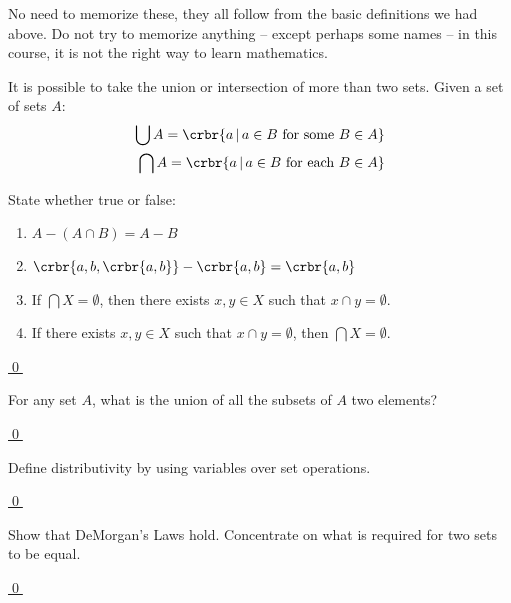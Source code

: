 \documentclass[11pt]{article}
\begin{document}
{%

\item No need to memorize these, they all follow from the basic definitions we
had above. Do not try to memorize anything -- except perhaps some names -- in
this course, it is not the right way to
learn mathematics.  

\item It is possible to take the union or intersection of more than two sets. Given a set of sets $A$:
\begin{align*}
	\bigcup A = \crbr{a\, |\, a \in B\text{ for some }B \in A}\\
	\bigcap A = \crbr{a\, |\, a \in B\text{ for each }B \in A}
\end{align*}

\hrulefill

\begin{uexercise}\label{ex-bigOp}
State whether true or false:
\begin{enumerate}

\item\label{ex-bigOp-x}
$A - (A \cap B) = A - B$
\item\label{ex-bigOp-y}
$\crbr{a,b,\crbr{a,b}} - \crbr{a,b} = \crbr{a,b}$

\item\label{ex-bigOp-a} If $\bigcap X = \emptyset$, then there exists $x,y\in X$ such that $x\cap
y = \emptyset$.
\item\label{ex-bigOp-b} If there exists $x,y\in X$ such that $x\cap
y = \emptyset$, then $\bigcap X = \emptyset$.
\end{enumerate}

\hyperlink{ex-bigOp-sol}{\qed}
\end{uexercise}

\begin{uexercise}\label{ex-tsubs}
For any set $A$, what is the union of all the subsets of $A$  two
elements?

\hyperlink{ex-tsubs-sol}{\qed}
\end{uexercise}

\begin{uexercise}[*] \label{ex-dist} 
Define distributivity by using variables over set operations.

\hyperlink{ex-dist-sol}{\qed}
\end{uexercise}

\begin{uexercise}[*] \label{ex-demorg} 
Show that DeMorgan's Laws hold.  Concentrate on what is required for
two sets to be equal.

\hyperlink{ex-demorg-sol}{\qed}
\end{uexercise}
\hrulefill
}
\end{document}
